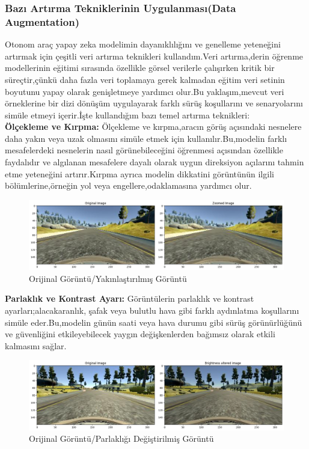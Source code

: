 \documentclass{article}
\begin{document}
\subsubsection{Bazı Artırma Tekniklerinin Uygulanması(Data Augmentation)}
Otonom araç yapay zeka modelimin dayanıklılığını ve genelleme yeteneğini artırmak için çeşitli veri artırma teknikleri kullandım.Veri artırma,derin öğrenme modellerinin eğitimi sırasında özellikle görsel verilerle çalışırken kritik bir süreçtir,çünkü daha fazla veri toplamaya gerek kalmadan eğitim veri setinin boyutunu yapay olarak genişletmeye yardımcı olur.Bu yaklaşım,mevcut veri örneklerine bir dizi dönüşüm uygulayarak farklı sürüş koşullarını ve senaryolarını simüle etmeyi içerir.İşte kullandığım bazı temel artırma teknikleri:\\[5pt]
\textbf{Ölçekleme ve Kırpma:} Ölçekleme ve kırpma,aracın görüş açısındaki nesnelere daha yakın veya uzak olmasını simüle etmek için kullanılır.Bu,modelin farklı mesafelerdeki nesnelerin nasıl görünebileceğini öğrenmesi açısından özellikle faydalıdır ve algılanan mesafelere dayalı olarak uygun direksiyon açılarını tahmin etme yeteneğini artırır.Kırpma ayrıca modelin dikkatini görüntünün ilgili bölümlerine,örneğin yol veya engellere,odaklamasına yardımcı olur. \\
\begin{figure}[h]
  \centering
  \includegraphics[width=1\textwidth]{image/1..png} %
\caption{Orijinal Görüntü/Yakınlaştırılmış Görüntü}
  \label{fig:cnnmimari}  
\end{figure}
\newline
\textbf{Parlaklık ve Kontrast Ayarı:} Görüntülerin parlaklık ve kontrast ayarları;alacakaranlık, şafak veya bulutlu hava gibi farklı aydınlatma koşullarını simüle eder.Bu,modelin günün saati veya hava durumu gibi sürüş görünürlüğünü ve güvenliğini etkileyebilecek yaygın değişkenlerden bağımsız olarak etkili kalmasını sağlar. 
\begin{figure}[h]
  \centering
  \includegraphics[width=1\textwidth]{image/2..png} %
\caption{Orijinal Görüntü/Parlaklığı Değiştirilmiş Görüntü}
  \label{fig:cnnmimari}  
\end{figure}
\newpage
\end{document}
